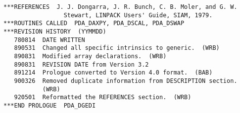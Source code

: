\begin{verbatim}
***REFERENCES  J. J. Dongarra, J. R. Bunch, C. B. Moler, and G. W.
                 Stewart, LINPACK Users' Guide, SIAM, 1979.
***ROUTINES CALLED  PDA_DAXPY, PDA_DSCAL, PDA_DSWAP
***REVISION HISTORY  (YYMMDD)
   780814  DATE WRITTEN
   890531  Changed all specific intrinsics to generic.  (WRB)
   890831  Modified array declarations.  (WRB)
   890831  REVISION DATE from Version 3.2
   891214  Prologue converted to Version 4.0 format.  (BAB)
   900326  Removed duplicate information from DESCRIPTION section.
           (WRB)
   920501  Reformatted the REFERENCES section.  (WRB)
***END PROLOGUE  PDA_DGEDI
\end{verbatim}



